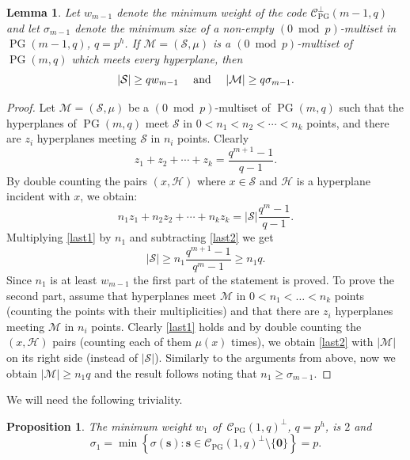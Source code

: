 \documentclass[12pt]{article}
\newcommand{\cC}{{\mathcal C}}
\newcommand{\cM}{{\mathcal M}}
\newcommand{\cS}{{\mathcal S}}
\newtheorem{lemma}[theorem]{Lemma}
\newtheorem{proposition}[theorem]{Proposition}
\DeclareMathOperator{\PG}{{PG}}
\begin{document}
	\begin{lemma}
		\label{lastlemma}
		Let $w_{m-1}$ denote the minimum weight of the code  $\cC^\perp_{\mathrm{PG}}(m-1,q)$ and let $\sigma_{m-1}$ denote the minimum size of a non-empty $(0 \bmod p)$-multiset in $\PG(m-1,q)$, $q=p^h$. 
		If $\cM=(\cS, \mu)$ is a $(0 \bmod p)$-multiset of $\PG(m,q)$ which meets every hyperplane, then
		$$|\cS| \geq qw_{m-1} \quad \textnormal{ and } \quad  |\cM| \geq q\sigma_{m-1}.$$
	\end{lemma}
	\begin{proof}
		Let $\cM=(\cS, \mu)$ be a $(0 \bmod p)$-multiset of $\PG(m,q)$ such that the hyperplanes of $\PG(m,q)$ meet $\cS$ in $0< n_1 < n_2 < \cdots < n_k$ points, and there are $z_{i}$ hyperplanes meeting $\cS$ in $n_i$ points. 
		Clearly 
		\begin{equation}
			\label{last1}
			z_{1} + z_{2} + \cdots + z_k= \frac{q^{m+1} - 1}{q - 1}. 
		\end{equation}
		By double counting the pairs $(x,\mathcal{H})$ where $x\in \cS$ and $\mathcal{H}$ is a hyperplane incident with $x$, we obtain:
		\begin{equation}
			\label{last2}
			n_1 z_{1} + n_2 z_{2} + \cdots + n_kz_k = \vert \cS \vert \frac{q^m - 1}{q - 1}.
		\end{equation}
		Multiplying \eqref{last1} by $n_1$ and subtracting \eqref{last2} we get
		\[
		\vert \cS \vert \geq n_1 \frac{q^{m+1} - 1}{q^m - 1} \geq n_1 q.
		\]
		Since $n_1$ is at least $w_{m-1}$ the first part of the statement is proved.
		To prove the second part, assume that hyperplanes meet $\cM$ in $0<n_1<\ldots<n_k$ points (counting the points with their multiplicities) and that there are $z_i$ hyperplanes meeting $\cM$ in $n_i$ points. Clearly \eqref{last1} holds and by double counting the $(x,\mathcal{H})$ pairs (counting each of them $\mu(x)$ times), we obtain \eqref{last2} with $|\cM|$ on its right side (instead of $|\cS|$). Similarly to the arguments from above, now we obtain  
		$\vert \cM \vert \geq n_1q$ and the result follows noting that $n_1 \geq \sigma_{m-1}$.
	\end{proof}
	
	We will need the following triviality.
	
	\begin{proposition}
		\label{lastproposition}
		The minimum weight $w_1$ of \,$\cC_{\PG}(1,q)^\perp$, $q=p^h$, is $2$ and  
		\[\sigma_1=\min  \left \{\sigma(\mathbf{s}) : \mathbf{s} \in \cC_{\PG}(1,q)^\perp \setminus  \{\boldsymbol{0}\} \right \}=p.\] 
	\end{proposition}
	
\end{document}

